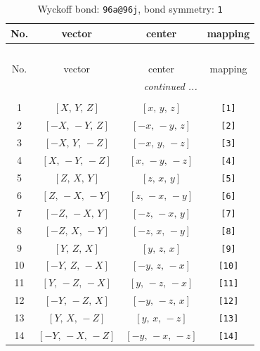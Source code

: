 \documentclass[fleqn,8pt]{jsarticle}
\begin{document}
\begin{longtable}{cccc}
\caption{Wyckoff bond: {\tt 96a@96j}, bond symmetry: {\tt 1}}
 \\
 \hline \hline
No. & vector & center & mapping \\ \hline \endfirsthead

\multicolumn{3}{l}{\tablename\ \thetable{}} \\
 \hline \hline
No. & vector & center & mapping \\ \hline \endhead

 \hline \hline
\multicolumn{3}{r}{\footnotesize\it continued ...} \\ \endfoot

 \hline \hline
\multicolumn{3}{r}{} \\ \endlastfoot

1 & $\left[ X,\, Y,\, Z \right]$ & $\left[ x,\, y,\, z \right]$ & {\tt [1]} \\ \hline
2 & $\left[ - X,\, - Y,\, Z \right]$ & $\left[ - x,\, - y,\, z \right]$ & {\tt [2]} \\ \hline
3 & $\left[ - X,\, Y,\, - Z \right]$ & $\left[ - x,\, y,\, - z \right]$ & {\tt [3]} \\ \hline
4 & $\left[ X,\, - Y,\, - Z \right]$ & $\left[ x,\, - y,\, - z \right]$ & {\tt [4]} \\ \hline
5 & $\left[ Z,\, X,\, Y \right]$ & $\left[ z,\, x,\, y \right]$ & {\tt [5]} \\ \hline
6 & $\left[ Z,\, - X,\, - Y \right]$ & $\left[ z,\, - x,\, - y \right]$ & {\tt [6]} \\ \hline
7 & $\left[ - Z,\, - X,\, Y \right]$ & $\left[ - z,\, - x,\, y \right]$ & {\tt [7]} \\ \hline
8 & $\left[ - Z,\, X,\, - Y \right]$ & $\left[ - z,\, x,\, - y \right]$ & {\tt [8]} \\ \hline
9 & $\left[ Y,\, Z,\, X \right]$ & $\left[ y,\, z,\, x \right]$ & {\tt [9]} \\ \hline
10 & $\left[ - Y,\, Z,\, - X \right]$ & $\left[ - y,\, z,\, - x \right]$ & {\tt [10]} \\ \hline
11 & $\left[ Y,\, - Z,\, - X \right]$ & $\left[ y,\, - z,\, - x \right]$ & {\tt [11]} \\ \hline
12 & $\left[ - Y,\, - Z,\, X \right]$ & $\left[ - y,\, - z,\, x \right]$ & {\tt [12]} \\ \hline
13 & $\left[ Y,\, X,\, - Z \right]$ & $\left[ y,\, x,\, - z \right]$ & {\tt [13]} \\ \hline
14 & $\left[ - Y,\, - X,\, - Z \right]$ & $\left[ - y,\, - x,\, - z \right]$ & {\tt [14]} \\ \hline

\end{longtable}
\end{document}
